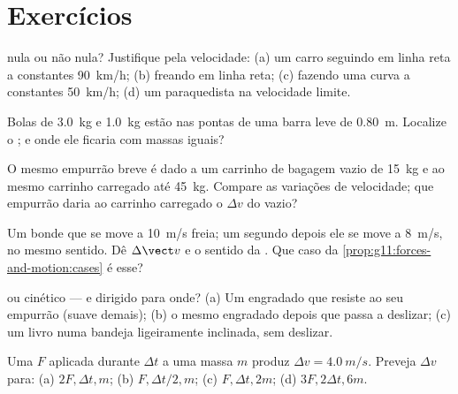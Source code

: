 \section{Exercícios}

\begin{exercise}[$\star$]\label{exo:g11:forces-and-motion:1}
 nula ou não nula? Justifique pela velocidade: (a) um
carro seguindo em linha reta a constantes \qty{90}{km/h}; (b) freando em
linha reta; (c) fazendo uma curva a constantes \qty{50}{km/h}; (d) um
paraquedista na velocidade limite.
\end{exercise}

\begin{exercise}[$\star$]\label{exo:g11:forces-and-motion:2}
Bolas de \qty{3.0}{kg} e \qty{1.0}{kg} estão nas pontas de uma barra leve
de \qty{0.80}{m}. Localize o ; e onde ele ficaria com
massas iguais?
\end{exercise}

\begin{exercise}[$\star$]\label{exo:g11:forces-and-motion:3}
O mesmo empurrão breve é dado a um carrinho de bagagem vazio de
\qty{15}{kg} e ao mesmo carrinho carregado até \qty{45}{kg}. Compare as
variações de velocidade; que empurrão daria ao carrinho carregado o
$\Delta v$ do vazio?
\end{exercise}

\begin{exercise}[$\star$]\label{exo:g11:forces-and-motion:4}
Um bonde que se move a \qty{10}{m/s} freia; um segundo depois ele se move
a \qty{8}{m/s}, no mesmo sentido. Dê $\Delta \vect v$ e o sentido da
. Que caso da \cref{prop:g11:forces-and-motion:cases} é
esse?
\end{exercise}

\begin{exercise}[$\star$]\label{exo:g11:forces-and-motion:5}
 ou cinético --- e dirigido para onde? (a) Um engradado
que resiste ao seu empurrão (suave demais); (b) o mesmo engradado depois
que passa a deslizar; (c) um livro numa bandeja ligeiramente inclinada,
sem deslizar.
\end{exercise}

\begin{exercise}[$\star\star$]\label{exo:g11:forces-and-motion:6}
Uma  $F$ aplicada durante $\Delta t$ a uma massa $m$
produz $\Delta v = \qty{4.0}{m/s}$. Preveja $\Delta v$ para: (a)
$2F, \Delta t, m$; (b) $F, \Delta t/2, m$; (c) $F, \Delta t, 2m$;
(d) $3F, 2\Delta t, 6m$.
\end{exercise}

